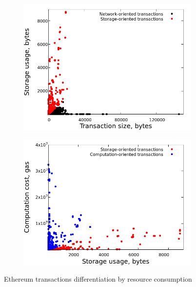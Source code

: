 \documentclass[]{llncs}   %
\begin{document}
\begin{figure}[h]
    \begin{subfigure}[b]{0.48\textwidth}
        \includegraphics[width=\textwidth]{figures/txs-size-storage}
        \caption{}
        \label{fig:a}
    \end{subfigure}
    \begin{subfigure}[b]{0.48\textwidth}
        \includegraphics[width=\textwidth]{figures/txs-storage-computation}
        \caption{}
        \label{fig:b}
    \end{subfigure}

    \caption{Ethereum transactions differentiation by resource consumption}
    \label{fig:eth}
\end{figure}
\end{document}
